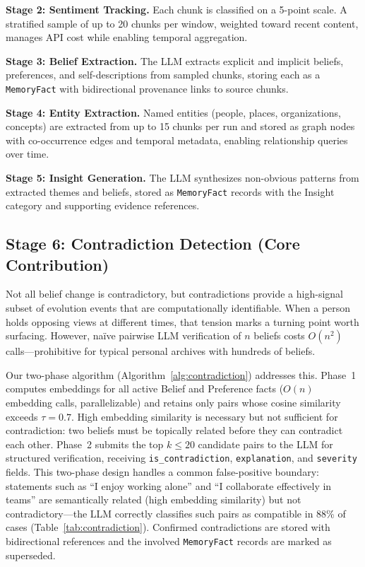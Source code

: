 \documentclass[pdflatex,sn-mathphys-num]{sn-jnl}
\begin{document}
\textbf{Stage 2: Sentiment Tracking.} Each chunk is classified on a 5-point scale. A stratified sample of up to 20 chunks per window, weighted toward recent content, manages API cost while enabling temporal aggregation.

\textbf{Stage 3: Belief Extraction.} The LLM extracts explicit and implicit beliefs, preferences, and self-descriptions from sampled chunks, storing each as a \texttt{MemoryFact} with bidirectional provenance links to source chunks.

\textbf{Stage 4: Entity Extraction.} Named entities (people, places, organizations, concepts) are extracted from up to 15 chunks per run and stored as graph nodes with co-occurrence edges and temporal metadata, enabling relationship queries over time.

\textbf{Stage 5: Insight Generation.} The LLM synthesizes non-obvious patterns from extracted themes and beliefs, stored as \texttt{MemoryFact} records with the Insight category and supporting evidence references.

\subsection{Stage 6: Contradiction Detection (Core Contribution)}\label{sec:contradiction}

Not all belief change is contradictory, but contradictions provide a high-signal subset of evolution events that are computationally identifiable. When a person holds opposing views at different times, that tension marks a turning point worth surfacing. However, na\"ive pairwise LLM verification of $n$ beliefs costs $O(n^2)$ calls---prohibitive for typical personal archives with hundreds of beliefs.

Our two-phase algorithm (Algorithm~\ref{alg:contradiction}) addresses this. Phase~1 computes embeddings for all active Belief and Preference facts ($O(n)$ embedding calls, parallelizable) and retains only pairs whose cosine similarity exceeds $\tau{=}0.7$. High embedding similarity is necessary but not sufficient for contradiction: two beliefs must be topically related before they can contradict each other. Phase~2 submits the top $k \leq 20$ candidate pairs to the LLM for structured verification, receiving \texttt{is\_contradiction}, \texttt{explanation}, and \texttt{severity} fields. This two-phase design handles a common false-positive boundary: statements such as ``I enjoy working alone'' and ``I collaborate effectively in teams'' are semantically related (high embedding similarity) but not contradictory---the LLM correctly classifies such pairs as compatible in 88\% of cases (Table~\ref{tab:contradiction}). Confirmed contradictions are stored with bidirectional references and the involved \texttt{MemoryFact} records are marked as superseded.
\end{document}
